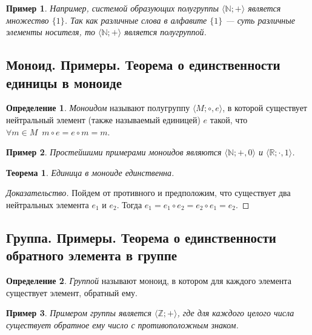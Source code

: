 \documentclass{article}
\newtheorem*{theorem*}{Теорема}
\theoremstyle{plain}
\newtheorem*{example*}{Пример}
\theoremstyle{definition}
\newtheorem{definition}{Определение}[subsection]
\begin{document}
\begin{example*}
	Например, системой образующих полугруппы \(\langle \mathbb{N}; + \rangle\) является множество \(\{1\}\). Так как различные слова в алфавите \(\{1\}\) — суть различные элементы носителя, то \(\langle \mathbb{N}; + \rangle\) является полугруппой.
\end{example*}

\subsection{Моноид. Примеры. Теорема о единственности единицы в моноиде}

\begin{definition}
	\textit{Моноидом} называют полугруппу \(\langle M; \circ, e\rangle\), в которой существует нейтральный элемент (также называемый единицей) \(e\) такой, что \(\forall m \in M \enspace m \circ e = e \circ m = m\).
\end{definition}

\begin{example*}
	Простейшими примерами моноидов являются \(\langle \mathbb{N}; +, 0\rangle\) и \(\langle \mathbb{R}; \cdot, 1 \rangle\).
\end{example*}

\begin{theorem*}
	Единица в моноиде единственна.
\end{theorem*}

\begin{proof}[Доказательство]
	Пойдем от противного и предположим, что существует два нейтральных элемента \(e_1\) и \(e_2\). Тогда \(e_1 = e_1 \circ e_2 = e_2 \circ e_1 = e_2\).
\end{proof}

\subsection{Группа. Примеры. Теорема о единственности обратного элемента в группе}

\begin{definition}
	\textit{Группой} называют моноид, в котором для каждого элемента существует элемент, обратный ему.
\end{definition}

\begin{example*}
	Примером группы является \(\langle \mathbb{Z}; + \rangle\), где для каждого целого числа существует обратное ему число с противоположным знаком.
\end{example*}
\end{document}
